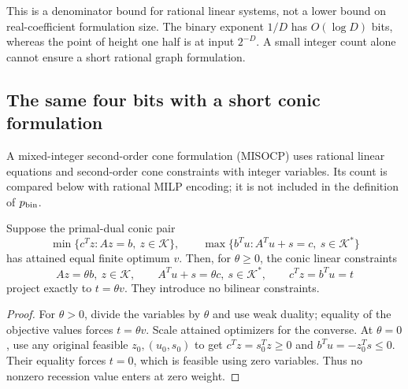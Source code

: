 This is a denominator bound for rational linear systems, not a lower
bound on real-coefficient formulation size. The binary exponent $1/D$
has $O(\log D)$ bits, whereas the point of height one half is at
input $2^{-D}$. A small integer count alone cannot ensure a short
rational graph formulation.

\subsection{The same four bits with a short conic formulation}

A mixed-integer second-order cone formulation (MISOCP) uses rational
linear equations and second-order cone constraints with integer
variables. Its count is compared below with rational MILP encoding;
it is not included in the definition of $p_{\mathrm{bin}}$.

\begin{lemma}\label{lem:conic-value}
Suppose the primal-dual conic pair
\[
 \min\{c^Tz:Az=b,\ z\in\mathcal K\},\qquad
 \max\{b^Tu:A^Tu+s=c,\ s\in\mathcal K^*\}
\]
has attained equal finite optimum $v$. Then, for $\theta\ge0$,
the conic linear constraints
\begin{equation}\label{eq:conic-value-homogeneous}
 Az=\theta b,\ z\in\mathcal K,\qquad
 A^Tu+s=\theta c,\ s\in\mathcal K^*,\qquad
 c^Tz=b^Tu=t
\end{equation}
project exactly to $t=\theta v$. They introduce no bilinear constraints.
\end{lemma}
\begin{proof}
For $\theta>0$, divide the variables by $\theta$ and use weak
duality; equality of the objective values forces $t=\theta v$.
Scale attained optimizers for the converse. At $\theta=0$, use any
original feasible $z_0,(u_0,s_0)$ to get
$c^Tz=s_0^Tz\ge0$ and $b^Tu=-z_0^Ts\le0$. Their equality forces
$t=0$, which is feasible using zero variables. Thus no nonzero
recession value enters at zero weight.
\end{proof}

